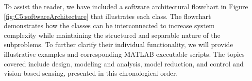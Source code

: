 %
To assist the reader, we have included a software architectural flowchart in Figure \ref{fig:C5:softwareArchitecture} that illustrates each class. The flowchart demonstrates how the classes can be interconnected to increase system complexity while maintaining the structured and separable nature of the subproblems. To further clarify their individual functionality, we will provide illustrative examples and corresponding MATLAB executable scripts. The topics covered include design, modeling and analysis, model reduction, and control and vision-based sensing, presented in this chronological order.